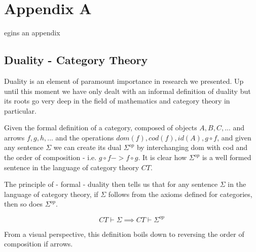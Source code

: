 %
%

\chapter{Appendix A}
\label{app:a}

egins an appendix\\

\section{Duality - Category Theory}

Duality is an element of paramount importance in research we presented. Up until this moment we have only dealt with an informal definition of duality but its roots go very deep in the field of mathematics and category theory in particular.

Given the formal definition of a category, composed of objects $ A, B, C, ... $ and arrows $ f, g, h, ... $ and the operations $ dom(f), cod(f), id(A), g \circ f $, and given any sentence $ \Sigma $ we can create its dual $ \Sigma^{op} $ by interchanging dom with cod and the order of composition - i.e. $ g \circ f -> f \circ g $. It is clear how $ \Sigma^{op} $ is a well formed sentence in the language of category theory $ CT $.

The principle of - formal - duality then tells us that for any sentence $ \Sigma $ in the language of category theory, if $ \Sigma $ follows from the axioms defined for categories, then so does $ \Sigma^{op}$.

\[ CT \vdash \Sigma \implies CT \vdash \Sigma^{op} \]

From a visual perspective, this definition boils down to reversing the order of composition if arrows. 

\begin{center}
\begin{minipage}{.2\textwidth}
\end{minipage}
\begin{minipage}{.2\textwidth}
\end{minipage}
\end{center}

